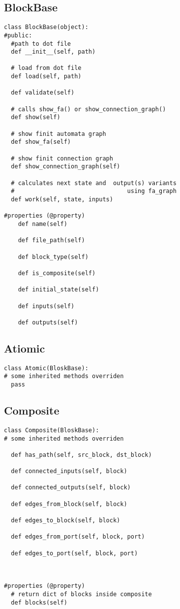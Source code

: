\documentclass[a4paper,16pt]{article}
\begin{document}
\newpage

\subsection*{BlockBase}
\begin{lstlisting}
class BlockBase(object):
#public:
  #path to dot file
  def __init__(self, path)

  # load from dot file
  def load(self, path) 
   
  def validate(self) 

  # calls show_fa() or show_connection_graph()
  def show(self) 
  
  # show finit automata graph
  def show_fa(self) 
  
  # show finit connection graph
  def show_connection_graph(self) 
     
  # calculates next state and  output(s) variants
  #                                using fa_graph         
  def work(self, state, inputs) 
  
#properties (@property)
    def name(self)  
  
    def file_path(self)

    def block_type(self)

    def is_composite(self) 

    def initial_state(self)

    def inputs(self)

    def outputs(self)
\end{lstlisting}

\subsection*{Atiomic}
\begin{lstlisting}
class Atomic(BloskBase):
# some inherited methods overriden
  pass
\end{lstlisting}

\subsection*{Composite}
\begin{lstlisting}
class Composite(BloskBase):
# some inherited methods overriden

  def has_path(self, src_block, dst_block)

  def connected_inputs(self, block)

  def connected_outputs(self, block)

  def edges_from_block(self, block)

  def edges_to_block(self, block)

  def edges_from_port(self, block, port)

  def edges_to_port(self, block, port)
  


#properties (@property)
  # return dict of blocks inside composite
  def blocks(self)
  
\end{lstlisting}
\end{document}

